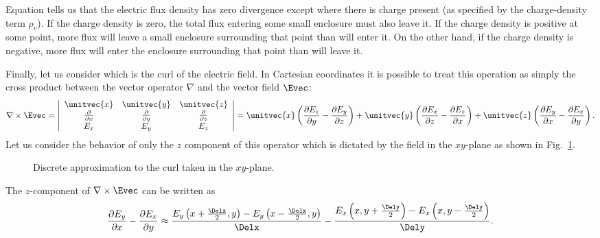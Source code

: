 Equation  tells us that the electric flux density has
zero divergence except where there is charge present (as specified by
the charge-density term $\rho_v$).  If the charge density is zero, the
total flux entering some small enclosure must also leave it.  If the
charge density is positive at some point, more flux will leave a small
enclosure surrounding that point than will enter it.  On the other
hand, if the charge density is negative, more flux will enter the
enclosure surrounding that point than will leave it.

Finally, let us consider  which is the curl of the
electric field.  In Cartesian coordinates it is possible to treat this
operation as simply the cross product between the vector operator
$\nabla$ and the vector field $\Evec$:
\begin{equation}
  \nabla\times\Evec =
  \left|
  \begin{array}{ccc}
     \unitvec{x} & \unitvec{y} & \unitvec{z} \\
     \frac{\partial}{\partial x} &
     \frac{\partial}{\partial y} &
     \frac{\partial}{\partial z} \\
     E_x & E_y & E_z
  \end{array}
  \right|
  =
  \unitvec{x}\left(\frac{\partial E_z}{\partial y} -
                   \frac{\partial E_y}{\partial z}\right) +
  \unitvec{y}\left(\frac{\partial E_x}{\partial z} -
                   \frac{\partial E_z}{\partial x}\right) +
  \unitvec{z}\left(\frac{\partial E_y}{\partial x} -
                   \frac{\partial E_x}{\partial y}\right).
  \label{eq:curl}
\end{equation}
Let us consider the behavior of only the $z$ component of this
operator which is dictated by the field in the $xy$-plane as shown in
Fig.\ \ref{fig:curl}.
\begin{figure}
  \begin{center}
  \end{center}
  \caption{Discrete approximation to the curl taken in the
  $xy$-plane. \label{fig:curl}}
\end{figure}
The $z$-component of $\nabla\times\Evec$ can be written as
\begin{equation}
  \frac{\partial E_y}{\partial x} -
  \frac{\partial E_x}{\partial y} \approx 
  \frac{E_y\left(x+\frac{\Delx}{2},y\right)
       -E_y\left(x-\frac{\Delx}{2},y\right)}{\Delx} -
  \frac{E_x\left(x,y+\frac{\Dely}{2}\right)
       -E_x\left(x,y-\frac{\Dely}{2}\right)}{\Dely}.
  \label{eq:curlII}
\end{equation}
